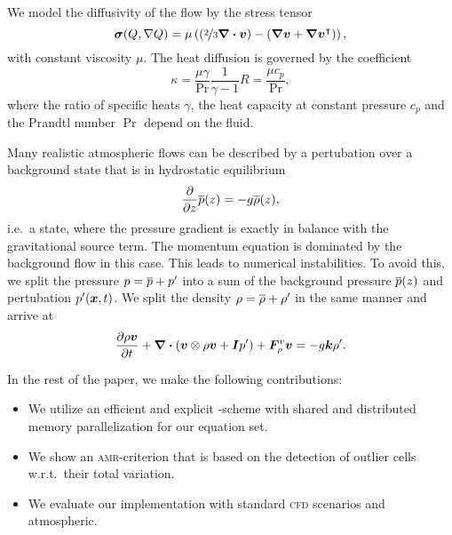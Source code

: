 \documentclass[runningheads]{llncs}
\begin{document}
We model the diffusivity of the flow by the stress tensor
\begin{equation}
  \label{eq:stress-tensor}
  \stressT(Q, \nabla Q) =
  \mu
  \left(
  \left(\nicefrac{2}{3} \divergence{\Qv} \right) -
  \left( \gradient{\Qv} + \gradient{\Qv}^\intercal \right)
  \right),
\end{equation}
with constant viscosity $\mu$.
The heat diffusion is governed by the coefficient
\begin{equation}
  \label{eq:heat-conduction-coeff}
  \kappa = \frac{\mu \gamma}{\Pr} \frac{1}{\gamma - 1} R = \frac{\mu c_p}{\Pr},
\end{equation}
where the ratio of specific heats $\gamma$, the heat capacity at constant pressure $c_p$ and the Prandtl number $\Pr$ depend on the fluid.

Many realistic atmospheric flows can be described by a pertubation over a background state that is in hydrostatic equilibrium
\newcommand{\backgroundPressure}{\overline{\pressure}}
\newcommand{\backgroundRho}{\overline{\Qrho}}
\begin{equation}
  \label{eq:hydrostatic-balance}
  \pdv{}{z} \backgroundPressure{\left (z \right )} = -g \backgroundRho(z),
\end{equation}
i.e.\ a state, where the pressure gradient is exactly in balance with the gravitational source term.
The momentum equation is dominated by the background flow in this case.
This leads to numerical instabilities.
To avoid this, we split the pressure $\pressure = \backgroundPressure + \pressure'$ into a sum of the background pressure $\backgroundPressure(z)$ and pertubation $p'(\bm{x}, t)$.
We split the density $\Qrho = \backgroundRho + \Qrho'$ in the same manner and arrive at
\begin{equation}
  \label{eq:momentum-equation-split}
  \pdv{\Qj}{t}+ \divergence{ \left(
    \Qv \otimes \Qj + \bm{I} \pressure'
    \right)
  } + \viscFlux_\Qj
  =
  -g \bm{k} \Qrho'.
\end{equation}

In the rest of the paper, we make the following contributions:
\begin{itemize}
\item
  We utilize an efficient and  explicit \aderdg{}-scheme with shared and distributed memory parallelization for our equation set.
\item We show an \textsc{amr}-criterion that is based on the detection of outlier cells w.r.t.\ their total variation.
\item We evaluate our implementation with standard \textsc{cfd} scenarios and atmospheric.
\end{itemize}
\end{document}
